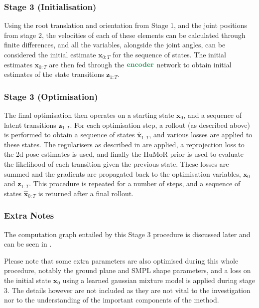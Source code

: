 \subsubsection{Stage 3 (Initialisation)}
Using the root translation and orientation from Stage 1, and the joint positions from stage 2, the velocities of each of these elements can be calculated through finite differences, and all the variables, alongside the joint angles, can be considered the initial estimate $\mathbf{x}_{0:T}$ for the sequence of states. The initial estimates $\mathbf{x}_{0:T}$ are then fed through the $\textbf{\textcolor{ForestGreen}{encoder}}$ network to obtain initial estimates of the state transitions $\textbf{z}_{1:T}$.

\subsubsection{Stage 3 (Optimisation)}
The final optimisation then operates on a starting state $\mathbf{x}_0$, and a sequence of latent transitions $\textbf{z}_{1:T}$. For each optimisation step, a rollout (as described above) is performed to obtain a sequence of states $\mathbf{\hat{x}}_{1:T}$, and various losses are applied to these states. The regularisers as described in  are applied, a reprojection loss to the 2d pose estimates is used, and finally the HuMoR prior is used to evaluate the likelihood of each transition given the previous state. These losses are summed and the gradients are propagated back to the optimisation variables, $\mathbf{x}_0$ and $\textbf{z}_{1:T}$. This procedure is repeated for a number of steps, and a sequence of states $\mathbf{\hat{x}}_{0:T}$ is returned after a final rollout.


\subsubsection{Extra Notes}
\label{sec:humor_testops_extra_notes}

The computation graph entailed by this Stage 3 procedure is discussed later and can be seen in .

Please note that some extra parameters are also optimised during this whole procedure, notably the ground plane and SMPL shape parameters, and a loss on the initial state $\mathbf{x}_0$ using a learned gaussian mixture model is applied during stage 3. The details however are not included as they are not vital to the investigation nor to the understanding of the important components of the method.